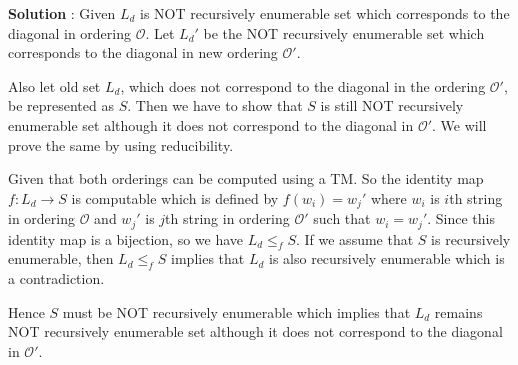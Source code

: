\documentclass{article}
\begin{document}
    \textbf{Solution} : Given $L_d$ is NOT recursively enumerable set which corresponds to the diagonal in ordering $\mathcal{O}$. Let $L_d'$ be the NOT recursively enumerable set which corresponds to the diagonal in new ordering $\mathcal{O}'$. 
    
    Also let old set $L_d$, which does not correspond to the diagonal in the ordering $\mathcal{O}'$, be represented as $S$. Then we have to show that $S$ is still NOT recursively enumerable set although it does not correspond to the diagonal in $\mathcal{O}'$. We will prove the same by using reducibility.
    
    Given that both orderings can be computed using a TM. So the identity map $f:L_d\rightarrow S$ is computable which is defined by $f(w_i)=w_j'$ where $w_i$ is $i$th string in ordering $\mathcal{O}$ and $w_j'$ is $j$th string in ordering $\mathcal{O}'$ such that $w_i=w_j'$. Since this identity map is a bijection, so we have $L_d\leq_f S$. If we assume that $S$ is recursively enumerable, then $L_d\leq_f S$ implies that $L_d$ is also recursively enumerable which is a contradiction. 
    
    Hence $S$ must be NOT recursively enumerable which implies that $L_d$ remains NOT recursively enumerable set although it does not correspond to the diagonal in $\mathcal{O}'$.
    
\end{document}
